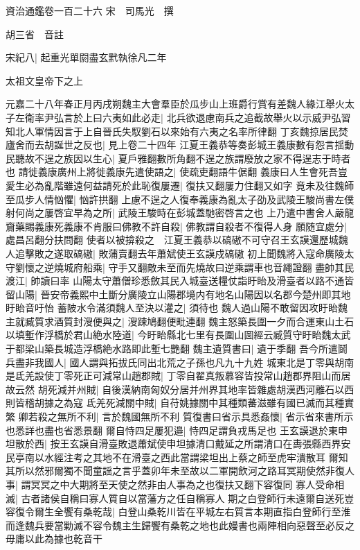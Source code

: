 資治通鑑卷一百二十六
宋　司馬光　撰

胡三省　音註

宋紀八|{
	起重光單閼盡玄黓執徐凡二年}


太祖文皇帝下之上

元嘉二十八年春正月丙戌朔魏主大會羣臣於瓜步山上班爵行賞有差魏人緣江舉火太子左衛率尹弘言於上曰六夷如此必走|{
	北兵欲退慮南兵之追截故舉火以示威尹弘習知北人軍情因言于上自晉氏失馭劉石以來始有六夷之名率所律翻}
丁亥魏掠居民焚廬舍而去胡誕世之反也|{
	見上卷二十四年}
江夏王義恭等奏彭城王義康數有怨言揺動民聽故不逞之族因以生心|{
	夏戶雅翻數所角翻不逞之族謂廢放之家不得逞志于時者也}
請徙義康廣州上將徙義康先遣使語之|{
	使疏吏翻語牛倨翻}
義康曰人生會死吾豈愛生必為亂階雖遠何益請死於此恥復屢遷|{
	復扶又翻屢力住翻又如字}
竟未及往魏師至瓜步人情忷懼|{
	忷許拱翻}
上慮不逞之人復奉義康為亂太子劭及武陵王駿尚書左僕射何尚之屢啓宜早為之所|{
	武陵王駿時在彭城蓋馳密啓言之也}
上乃遣中書舍人嚴龍齎藥賜義康死義康不肯服曰佛教不許自殺|{
	佛教謂自殺者不復得人身}
願随宜處分|{
	處昌呂翻分扶問翻}
使者以被揜殺之　江夏王義恭以碻磝不可守召王玄謨還歷城魏人追擊敗之遂取碻磝|{
	敗蒲賣翻去年蕭斌使王玄謨戍碻磝}
初上聞魏將入寇命廣陵太守劉懷之逆燒城府船乘|{
	守手又翻敵未至而先燒故曰逆乘謂車也音繩證翻}
盡帥其民渡江|{
	帥讀曰率}
山陽太守蕭僧珍悉斂其民入城臺送糧仗詣盱眙及滑臺者以路不通皆留山陽|{
	晉安帝義熙中土斷分廣陵立山陽郡境内有地名山陽因以名郡今楚州即其地盱眙音吁怡}
蓄陂水令滿須魏人至決以灌之|{
	須待也}
魏人過山陽不敢留因攻盱眙魏主就臧質求酒質封溲便與之|{
	溲踈鳩翻便毗連翻}
魏主怒築長圍一夕而合運東山土石以填塹作浮橋於君山絶水陸道|{
	今盱眙縣北七里有長圍山圖經云臧質守盱眙魏太武于都梁山築長城造浮橋絶水路即此塹七艷翻}
魏主遺質書曰|{
	遺于季翻}
吾今所遣鬬兵盡非我國人|{
	國人謂與拓拔氏同出北荒之子孫也凡九十九姓}
城東北是丁零與胡南是氐羌設使丁零死正可減常山趙郡賊|{
	丁零自翟真叛慕容皆投常山趙郡界阻山而居故云然}
胡死減并州賊|{
	自後漢納南匈奴分居并州界其地率皆雜處胡漢西河離石以西則皆稽胡據之為寇}
氐羌死減關中賊|{
	自苻姚據關中其種類蕃滋雖有國已滅而其種實繁}
卿若殺之無所不利|{
	言於魏國無所不利}
質復書曰省示具悉姦懷|{
	省示省來書所示也悉詳也盡也省悉景翻}
爾自恃四足屢犯邉|{
	恃四足謂負戎馬足也}
王玄謨退於東申坦散於西|{
	按王玄謨自滑臺敗退蕭斌使申坦據清口戴延之所謂清口在夀張縣西界安民亭南以水經注考之其地不在滑臺之西此當謂梁坦出上蔡之師至虎牢潰散耳}
爾知其所以然邪爾獨不聞童謡之言乎蓋卯年未至故以二軍開飲河之路耳冥期使然非復人事|{
	謂冥冥之中大期將至天使之然非由人事為之也復扶又翻下容復同}
寡人受命相滅|{
	古者諸侯自稱曰寡人質自以當藩方之任自稱寡人}
期之白登師行未遠爾自送死豈容復令爾生全饗有桑乾哉|{
	白登山桑乾川皆在平城左右質言本期直指白登師行至淮而逢魏兵要當勦滅不容令魏主生歸饗有桑乾之地也此嫚書也兩陣相向惡聲至必反之毋庸以此為據也乾音干}
